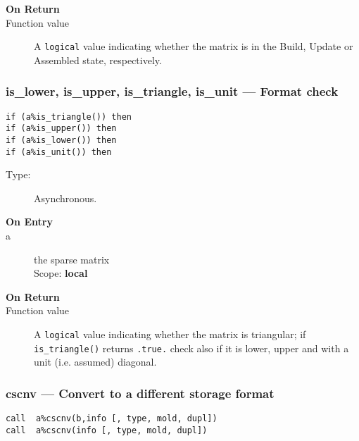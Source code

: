 \begin{description}
\item[\bf On Return]
\item[Function value] A \verb|logical| value indicating whether the
  matrix is in the Build, Update or Assembled state, respectively. 
\end{description}

\subsubsection*{is\_lower, is\_upper, is\_triangle, is\_unit  ---
  Format  check}

\begin{verbatim}
if (a%is_triangle()) then 
if (a%is_upper()) then 
if (a%is_lower()) then 
if (a%is_unit()) then 
\end{verbatim}

\begin{description}
\item[Type:] Asynchronous.
\item[\bf On Entry]
\item[a] the sparse matrix\\
Scope: {\bf local}\\
\end{description}

\begin{description}
\item[\bf On Return]
\item[Function value] A \verb|logical| value indicating whether the
  matrix is triangular; if \verb|is_triangle()| returns \verb|.true.|
  check also if it is lower, upper and with a unit (i.e. assumed)
  diagonal. 
\end{description}


\subsubsection*{cscnv --- Convert to a different storage format}

\begin{verbatim}
call  a%cscnv(b,info [, type, mold, dupl])
call  a%cscnv(info [, type, mold, dupl])
\end{verbatim}

